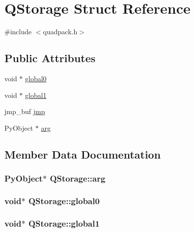 \hypertarget{structQStorage}{}\section{Q\+Storage Struct Reference}
\label{structQStorage}


{\ttfamily \#include $<$quadpack.\+h$>$}

\subsection*{Public Attributes}
\begin{DoxyCompactItemize}
\item 
void $\ast$ \hyperlink{structQStorage_a374a1377e1fd433fa5b198449dcffe35}{global0}
\item 
void $\ast$ \hyperlink{structQStorage_a198544cfd7e13f4c697244ba82a62766}{global1}
\item 
jmp\+\_\+buf \hyperlink{structQStorage_adee913a5ca5d3087723e9e78a3f30650}{jmp}
\item 
Py\+Object $\ast$ \hyperlink{structQStorage_aeaacf925a4caf56fe5ea2b87cdbc4f69}{arg}
\end{DoxyCompactItemize}


\subsection{Member Data Documentation}
\hypertarget{structQStorage_aeaacf925a4caf56fe5ea2b87cdbc4f69}{}
\subsubsection[{arg}]{\setlength{\rightskip}{0pt plus 5cm}Py\+Object$\ast$ Q\+Storage\+::arg}\label{structQStorage_aeaacf925a4caf56fe5ea2b87cdbc4f69}
\hypertarget{structQStorage_a374a1377e1fd433fa5b198449dcffe35}{}
\subsubsection[{global0}]{\setlength{\rightskip}{0pt plus 5cm}void$\ast$ Q\+Storage\+::global0}\label{structQStorage_a374a1377e1fd433fa5b198449dcffe35}
\hypertarget{structQStorage_a198544cfd7e13f4c697244ba82a62766}{}
\subsubsection[{global1}]{\setlength{\rightskip}{0pt plus 5cm}void$\ast$ Q\+Storage\+::global1}\label{structQStorage_a198544cfd7e13f4c697244ba82a62766}
\hypertarget{structQStorage_adee913a5ca5d3087723e9e78a3f30650}{}
